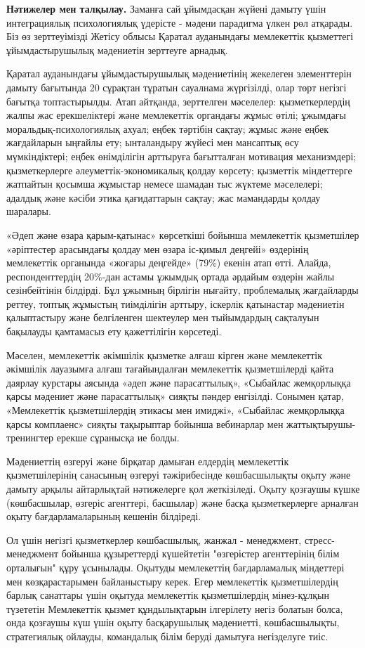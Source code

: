 {\bfseries Нәтижелер мен талқылау.} Заманға сай ұйымдасқан жүйені дамыту
үшін интеграциялық психологиялық үдерісте - мәдени парадигма үлкен рөл
атқарады. Біз өз зерттеуімізді Жетісу облысы Қаратал ауданындағы
мемлекеттік қызметтегі ұйымдастырушылық мәдениетін зерттеуге арнадық.

Қаратал ауданындағы ұйымдастырушылық мәдениетінің жекелеген элементтерін
дамыту бағытында 20 сұрақтан тұратын сауалнама жүргізілді, олар төрт
негізгі бағытқа топтастырылды. Атап айтқанда, зерттелген мәселелер:
қызметкерлердің жалпы жас ерекшеліктері және мемлекеттік органдағы жұмыс
өтілі; ұжымдағы моральдық-психологиялық ахуал; еңбек тәртібін сақтау;
жұмыс және еңбек жағдайларын ыңғайлы ету; ынталандыру жүйесі мен
мансаптық өсу мүмкіндіктері; еңбек өнімділігін арттыруға бағытталған
мотивация механизмдері; қызметкерлерге әлеуметтік-экономикалық қолдау
көрсету; қызметтік міндеттерге жатпайтын қосымша жұмыстар немесе шамадан
тыс жүктеме мәселелері; адалдық және кәсіби этика қағидаттарын сақтау;
жас мамандарды қолдау шаралары.

«Әдеп және өзара қарым-қатынас» көрсеткіші бойынша мемлекеттік
қызметшілер «әріптестер арасындағы қолдау мен өзара іс-қимыл деңгейі»
өздерінің мемлекеттік органында «жоғары деңгейде» (79\%) екенін атап
өтті. Алайда, респонденттердің 20\%-дан астамы ұжымдық ортада әрдайым
өздерін жайлы сезінбейтінін білдірді. Бұл ұжымның бірлігін нығайту,
проблемалық жағдайларды реттеу, топтық жұмыстың тиімділігін арттыру,
іскерлік қатынастар мәдениетін қалыптастыру және белгіленген шектеулер
мен тыйымдардың сақталуын бақылауды қамтамасыз ету қажеттілігін
көрсетеді.

Мәселен, мемлекеттік әкімшілік қызметке алғаш кірген және мемлекеттік
әкімшілік лауазымға алғаш тағайындалған мемлекеттік қызметшілерді қайта
даярлау курстары аясында «әдеп және парасаттылық», «Сыбайлас жемқорлыққа
қарсы мәдениет және парасаттылық» сияқты пәндер енгізілді. Сонымен
қатар, «Мемлекеттік қызметшілердің этикасы мен имиджі», «Сыбайлас
жемқорлыққа қарсы комплаенс» сияқты тақырыптар бойынша вебинарлар мен
жаттықтырушы-тренингтер ерекше сұранысқа ие болды.

Мәдениеттің өзгеруі және бірқатар дамыған елдердің мемлекеттік
қызметшілерінің санасының өзгеруі тәжірибесінде көшбасшылықты оқыту және
дамыту арқылы айтарлықтай нәтижелерге қол жеткізіледі. Оқыту қозғаушы
күшке (көшбасшылар, өзгеріс агенттері, басшылар) және басқа
қызметкерлерге арналған оқыту бағдарламаларының кешенін білдіреді.

Ол үшін негізгі қызметкерлер көшбасшылық, жанжал - менеджмент,
стресс-менеджмент бойынша құзыреттерді күшейтетін "өзгерістер
агенттерінің білім орталығын" құру ұсынылады. Оқытуды мемлекеттің
бағдарламалық міндеттері мен көзқарастарымен байланыстыру керек. Егер
мемлекеттік қызметшілердің барлық санаттары үшін оқытуда мемлекеттік
қызметшілердің мінез-құлқын түзететін Мемлекеттік қызмет құндылықтарын
ілгерілету негіз болатын болса, онда қозғаушы күш үшін оқыту
басқарушылық мәдениетті, көшбасшылықты, стратегиялық ойлауды, командалық
білім беруді дамытуға негізделуге тиіс.

